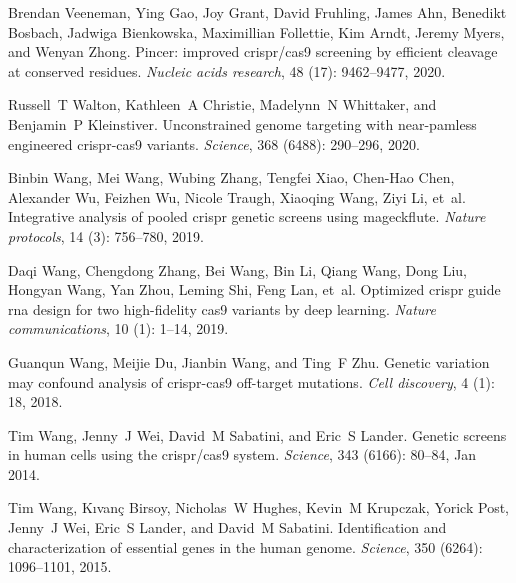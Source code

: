 \documentclass[pdftex,english,10pt]{article}
\begin{document}
{\begin{thebibliography}{105}
Brendan Veeneman, Ying Gao, Joy Grant, David Fruhling, James Ahn, Benedikt
  Bosbach, Jadwiga Bienkowska, Maximillian Follettie, Kim Arndt, Jeremy Myers,
  and Wenyan Zhong.
\newblock Pincer: improved crispr/cas9 screening by efficient cleavage at
  conserved residues.
\newblock \emph{Nucleic acids research}, 48 (17): 9462--9477,
  2020.

Russell~T Walton, Kathleen~A Christie, Madelynn~N Whittaker, and Benjamin~P
  Kleinstiver.
\newblock Unconstrained genome targeting with near-pamless engineered
  crispr-cas9 variants.
\newblock \emph{Science}, 368 (6488): 290--296, 2020.

Binbin Wang, Mei Wang, Wubing Zhang, Tengfei Xiao, Chen-Hao Chen, Alexander Wu,
  Feizhen Wu, Nicole Traugh, Xiaoqing Wang, Ziyi Li, et~al.
\newblock Integrative analysis of pooled crispr genetic screens using
  mageckflute.
\newblock \emph{Nature protocols}, 14 (3): 756--780,
  2019{}.

Daqi Wang, Chengdong Zhang, Bei Wang, Bin Li, Qiang Wang, Dong Liu, Hongyan
  Wang, Yan Zhou, Leming Shi, Feng Lan, et~al.
\newblock Optimized crispr guide rna design for two high-fidelity cas9 variants
  by deep learning.
\newblock \emph{Nature communications}, 10 (1): 1--14,
  2019{}.

Guanqun Wang, Meijie Du, Jianbin Wang, and Ting~F Zhu.
\newblock Genetic variation may confound analysis of crispr-cas9 off-target
  mutations.
\newblock \emph{Cell discovery}, 4 (1): 18, 2018.

Tim Wang, Jenny~J Wei, David~M Sabatini, and Eric~S Lander.
\newblock Genetic screens in human cells using the crispr/cas9 system.
\newblock \emph{Science}, 343 (6166): 80--84, Jan 2014.

Tim Wang, K{\i}van{\c{c}} Birsoy, Nicholas~W Hughes, Kevin~M Krupczak, Yorick
  Post, Jenny~J Wei, Eric~S Lander, and David~M Sabatini.
\newblock Identification and characterization of essential genes in the human
  genome.
\newblock \emph{Science}, 350 (6264): 1096--1101, 2015.


\end{thebibliography}}
\end{document}
